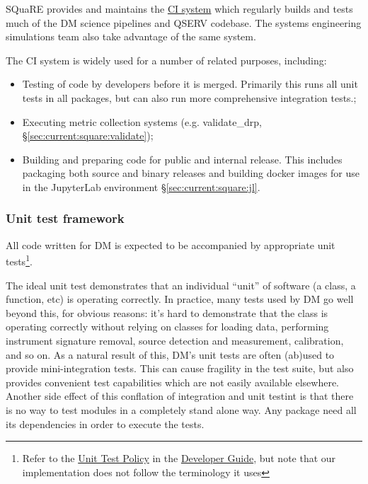 \documentclass[DM,authoryear,toc,lsstdraft]{lsstdoc}
\begin{document}
SQuaRE provides and maintains the \href{https://ci.lsst.codes}{CI system} which regularly builds and
tests much of the DM science pipelines and QSERV codebase.  The systems engineering simulations
team also take advantage of the same system.

The CI system is widely used for a number of related purposes, including:

\begin{itemize}

  \item{Testing of code by developers before it is merged.  Primarily this runs all unit tests in all
  packages, but can also run more comprehensive integration tests.;}
  \item{Executing \gls{metric} collection systems (e.g. validate\_drp,
  \S\ref{sec:current:square:validate});}
  \item{Building and preparing code for public and internal release. This includes
  packaging both source and binary releases and building docker images for use in the
  JupyterLab environment \S\ref{sec:current:square:jl}.}

\end{itemize}

\subsubsection{Unit test framework}
\label{sec:current:square:unit}

All code written for DM is expected to be accompanied by appropriate unit
tests\footnote{Refer to the
\href{https://developer.lsst.io/coding/unit_test_policy.html}{Unit Test
Policy} in the \href{https://developer.lsst.io}{Developer Guide}, but note
that our implementation does not follow the terminology it uses}.

The ideal unit test demonstrates that an individual ``unit'' of software (a
class, a function, etc) is operating correctly. In practice, many tests used
by DM go well beyond this, for obvious reasons: it's hard to demonstrate that
the  class is operating correctly without relying on
classes for loading data, performing instrument signature removal, source
detection and measurement, calibration, and so on. As a natural result of
this, DM's unit tests are often (ab)used to provide mini-integration tests.
This can cause fragility in the test suite, but also provides convenient
test capabilities which are not easily available elsewhere. Another side
effect of this conflation of integration and unit testint is that there
is no way to test modules in a completely stand alone way. Any package
need all its dependencies in order to execute the tests.
\end{document}
